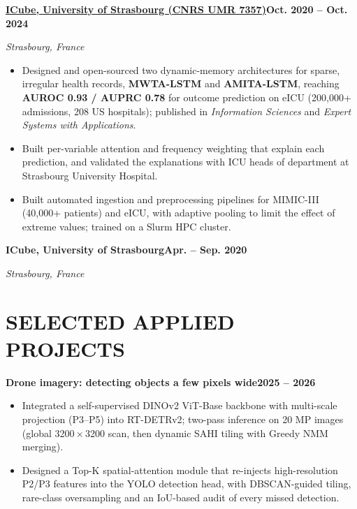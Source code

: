 \documentclass[10pt,a4paper]{article}
\newenvironment{cvitems}{\begin{itemize}[leftmargin=11pt,itemsep=0.5pt,topsep=1pt,parsep=0pt,label={\color{accent}\scriptsize$\blacktriangleright$}]\small}{\end{itemize}\vspace{2pt}}
\newcommand{\cvjob}[4]{%
  \noindent\textbf{#1}\hfill{\small\bfseries\textcolor{accent}{#2}}\par
  \noindent{\small\itshape\textcolor{muted}{#3}}\hfill{\small\itshape\textcolor{muted}{#4}}\par}
\newcommand{\cvproject}[3]{%
  \noindent\textbf{#1}\hfill{\small\bfseries\textcolor{accent}{#2}}\par
  \noindent{\footnotesize\textcolor{muted}{#3}}\par}
\begin{document}
\cvjob{\href{https://icube.unistra.fr}{ICube, University of Strasbourg (CNRS UMR 7357)}}{Oct. 2020 – Oct. 2024}{Ph.D. Researcher, deep temporal networks for irregular ICU trajectories}{Strasbourg, France}
\begin{cvitems}
  \item Designed and open-sourced two dynamic-memory architectures for sparse, irregular health records, \textbf{MWTA-LSTM} and \textbf{AMITA-LSTM}, reaching \textbf{AUROC 0.93 / AUPRC 0.78} for outcome prediction on eICU (200,000+ admissions, 208 US hospitals); published in \textit{Information Sciences} and \textit{Expert Systems with Applications}.
  \item Built per-variable attention and frequency weighting that explain each prediction, and validated the explanations with ICU heads of department at Strasbourg University Hospital.
  \item Built automated ingestion and preprocessing pipelines for MIMIC-III (40,000+ patients) and eICU, with adaptive pooling to limit the effect of extreme values; trained on a Slurm HPC cluster.
\end{cvitems}

\cvjob{ICube, University of Strasbourg}{Apr. – Sep. 2020}{Master’s Research Intern: interpretable anomaly detection (LSTM + shapelets, class activation maps)}{Strasbourg, France}
\vspace{4pt}

\section{SELECTED APPLIED PROJECTS}
\cvproject{Drone imagery: detecting objects a few pixels wide}{2025 – 2026}{RT-DETRv2, DINOv2 ViT-B, YOLO26-P2, SAHI/ASAHI, DBSCAN, Grad-CAM}
\begin{cvitems}
  \item Integrated a self-supervised DINOv2 ViT-Base backbone with multi-scale projection (P3–P5) into RT-DETRv2; two-pass inference on 20 MP images (global 3200\,$\times$\,3200 scan, then dynamic SAHI tiling with Greedy NMM merging).
  \item Designed a Top-K spatial-attention module that re-injects high-resolution P2/P3 features into the YOLO detection head, with DBSCAN-guided tiling, rare-class oversampling and an IoU-based audit of every missed detection.
\end{cvitems}
\end{document}
